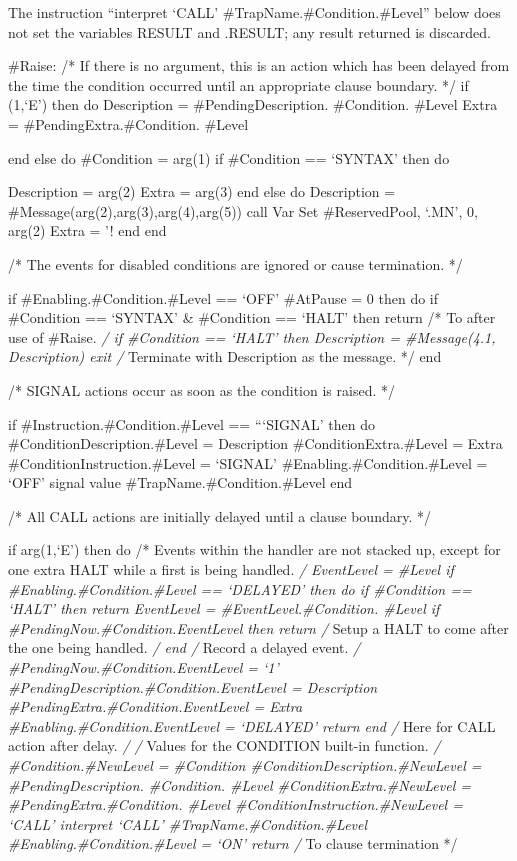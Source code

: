 The instruction ``interpret `CALL' \#TrapName.\#Condition.\#Level''
below does not set the variables RESULT and .RESULT; any result returned
is discarded.

\#Raise: /* If there is no argument, this is an action which has been
delayed from the time the condition occurred until an appropriate clause
boundary. */ if \arg(1,`E') then do Description = \#PendingDescription.
\#Condition. \#Level Extra = \#PendingExtra.\#Condition. \#Level

end else do \#Condition = arg(1) if \#Condition == `SYNTAX' then do

Description = arg(2) Extra = arg(3) end else do Description =
\#Message(arg(2),arg(3),arg(4),arg(5)) call Var Set \#ReservedPool,
`.MN', 0, arg(2) Extra = '! end end

/* The events for disabled conditions are ignored or cause termination.
*/

if \#Enabling.\#Condition.\#Level == `OFF' \textbar{} \#AtPause = 0 then
do if \#Condition == `SYNTAX' \& \#Condition == `HALT' then return /* To
after use of \#Raise. \emph{/ if \#Condition == `HALT' then Description
= \#Message(4.1, Description) exit /} Terminate with Description as the
message. */ end

/* SIGNAL actions occur as soon as the condition is raised. */

if \#Instruction.\#Condition.\#Level == ```SIGNAL' then do
\#ConditionDescription.\#Level = Description \#ConditionExtra.\#Level =
Extra \#ConditionInstruction.\#Level = `SIGNAL'
\#Enabling.\#Condition.\#Level = `OFF' signal value
\#TrapName.\#Condition.\#Level end

/* All CALL actions are initially delayed until a clause boundary. */

if arg(1,`E') then do /* Events within the handler are not stacked up,
except for one extra HALT while a first is being handled. \emph{/
EventLevel = \#Level if \#Enabling.\#Condition.\#Level == `DELAYED' then
do if \#Condition == `HALT' then return EventLevel =
\#EventLevel.\#Condition. \#Level if \#PendingNow.\#Condition.EventLevel
then return /} Setup a HALT to come after the one being handled. \emph{/
end /} Record a delayed event. \emph{/
\#PendingNow.\#Condition.EventLevel = `1'
\#PendingDescription.\#Condition.EventLevel = Description
\#PendingExtra.\#Condition.EventLevel = Extra
\#Enabling.\#Condition.EventLevel = `DELAYED' return end /} Here for
CALL action after delay. \emph{/ /} Values for the CONDITION built-in
function. \emph{/ \#Condition.\#NewLevel = \#Condition
\#ConditionDescription.\#NewLevel = \#PendingDescription. \#Condition.
\#Level \#ConditionExtra.\#NewLevel = \#PendingExtra.\#Condition.
\#Level \#ConditionInstruction.\#NewLevel = `CALL' interpret `CALL'
\#TrapName.\#Condition.\#Level \#Enabling.\#Condition.\#Level = `ON'
return /} To clause termination */

